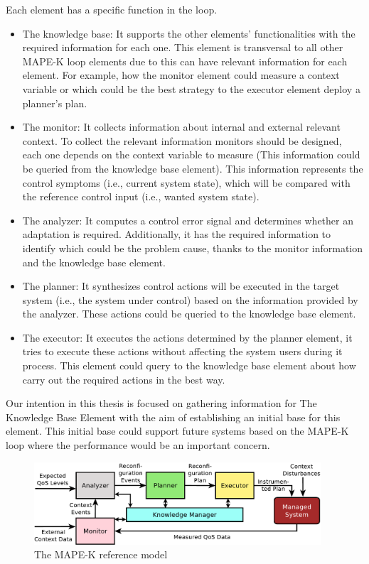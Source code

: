 Each element has a specific function in the loop.
\begin{itemize}
	\item The knowledge base: It supports the other elements' functionalities with the required information for each one. This element is transversal to all other MAPE-K loop elements due to this can have relevant information for each element. For example, how the monitor element could measure a context variable or which could be the best strategy to the executor element deploy a planner's plan.
	\item The monitor: It collects information about internal and external relevant context. To collect the relevant information monitors should be designed, each one depends on the context variable to measure (This information could be queried from the knowledge base element). This information represents the control symptoms (i.e., current system state), which will be compared with the reference control input (i.e., wanted system state).
	\item  The analyzer: It computes a control error signal and determines whether an adaptation is required. Additionally, it has the required information to identify which could be the problem cause, thanks to the monitor information and the knowledge base element.
	\item  The planner: It synthesizes control actions will be executed in the target system (i.e., the system under control) based on the information provided by the analyzer. These actions could be queried to the knowledge base element. 
	\item The executor: It executes the actions determined by the planner element, it tries to execute these actions without affecting the system users during it process. This element could query to the knowledge base element about how carry out the required actions in the best way.
\end{itemize}

Our intention in this thesis is focused on gathering information for The Knowledge Base Element with the aim of establishing an initial base for this element. This initial base could support future systems based on the MAPE-K loop where the performance would be an important concern.

\begin{figure}[ht!]
	\centering
	\includegraphics[width=0.95\textwidth]{fig/fback-loop-delta-dist}
	\caption{The MAPE-K reference model \cite{tamura:2012:QoS-CARE}}
	\label{fig:mape-k}
\end{figure}

